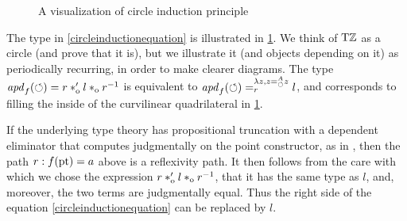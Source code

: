 \documentclass[a4paper,12pt]{amsart}
\begin{document}
\begin{figure}
  \centering
  \caption{A visualization of circle induction principle}
  \label{fig:circle-induction}
\end{figure}

The type in \cref{circleinductionequation} is illustrated in \cref{fig:circle-induction}.
We think of ${\mathrm{T}\mathbb{Z}}$ as a circle (and prove that it is),
but we illustrate it (and objects depending on it) as periodically recurring,
in order to make clearer diagrams.
The type $\mathop{{\it apd}_{f}}(\circlearrowleft) = r*_{\mathrm{o}}' l *_{\mathrm{o}} r^{-1}$ is equivalent to
$\mathop{{\it apd}_{f}}(\circlearrowleft) =^{\lambda z, z=^A_{\circlearrowleft}z}_r l$,
and corresponds to filling the inside of the curvilinear quadrilateral in \cref{fig:circle-induction}.

If the underlying type theory has propositional truncation with a dependent eliminator that computes judgmentally on the point constructor, as
in \cite[Ch. 6.9]{hottbook}, then the path $r : f({\mathord{\mathrm{pt}}})= a$ above is a reflexivity path.
It then follows
from the care with which we chose the expression $r*_{\mathrm{o}}' l *_{\mathrm{o}} r^{-1}$, that it has the same type as $l$, and, moreover, the two terms are
judgmentally equal.  Thus the right side of the equation \ref{circleinductionequation} can be replaced by $l$.
\end{document}
